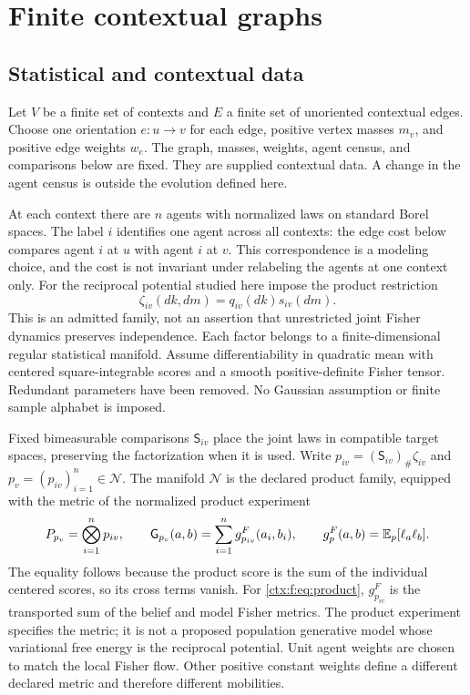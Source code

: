 \begingroup
\newcommand{\ctxnorm}[1]{\left\|#1\right\|}
\section{Finite contextual graphs}
\label{ctx:finite}

\subsection{Statistical and contextual data}

Let $V$ be a finite set of contexts and $E$ a finite set of unoriented contextual edges. Choose one orientation $e:u\to v$ for each edge, positive vertex masses $m_v$, and positive edge weights $w_e$. The graph, masses, weights, agent census, and comparisons below are fixed. They are supplied contextual data. A change in the agent census is outside the evolution defined here.

At each context there are $n$ agents with normalized laws on standard Borel spaces. The label $i$ identifies one agent across all contexts: the edge cost below compares agent $i$ at $u$ with agent $i$ at $v$. This correspondence is a modeling choice, and the cost is not invariant under relabeling the agents at one context only. For the reciprocal potential studied here impose the product restriction
\begin{equation}
 \zeta_{iv}(dk,dm)=q_{iv}(dk)s_{iv}(dm).
 \label{ctx:f:eq:product}
\end{equation}
This is an admitted family, not an assertion that unrestricted joint Fisher dynamics preserves independence. Each factor belongs to a finite-dimensional regular statistical manifold. Assume differentiability in quadratic mean with centered square-integrable scores and a smooth positive-definite Fisher tensor. Redundant parameters have been removed. No Gaussian assumption or finite sample alphabet is imposed.

Fixed bimeasurable comparisons $\mathsf S_{iv}$ place the joint laws in compatible target spaces, preserving the factorization when it is used. Write $p_{iv}=(\mathsf S_{iv})_\#\zeta_{iv}$ and $p_v=(p_{iv})_{i=1}^n\in\mathcal N$. The manifold $\mathcal N$ is the declared product family, equipped with the metric of the normalized product experiment
\begin{equation}
 P_{p_v}=\bigotimes_{i=1}^n p_{iv},\qquad
 \mathsf G_{p_v}(a,b)=\sum_{i=1}^n g^F_{p_{iv}}(a_i,b_i),\qquad
 g^F_p(a,b)=\mathbb E_p[\ell_a\ell_b].
 \label{ctx:f:eq:fisher}
\end{equation}
The equality follows because the product score is the sum of the individual centered scores, so its cross terms vanish. For \cref{ctx:f:eq:product}, $g^F_{p_{iv}}$ is the transported sum of the belief and model Fisher metrics. The product experiment specifies the metric; it is not a proposed population generative model whose variational free energy is the reciprocal potential. Unit agent weights are chosen to match the local Fisher flow. Other positive constant weights define a different declared metric and therefore different mobilities.

